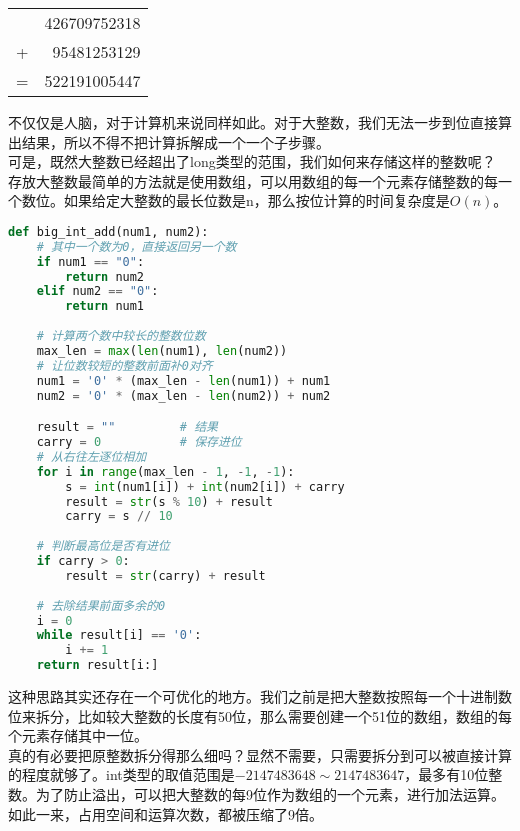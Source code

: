 \begin{table}[H]
	\centering
	\begin{tabular}{cD{.}{.}{3}}
		  & 426709752318 \\
		+ & 95481253129  \\
		\hline
		= & 522191005447
	\end{tabular}
\end{table}

不仅仅是人脑，对于计算机来说同样如此。对于大整数，我们无法一步到位直接算出结果，所以不得不把计算拆解成一个一个子步骤。 \\

可是，既然大整数已经超出了long类型的范围，我们如何来存储这样的整数呢？ \\

存放大整数最简单的方法就是使用数组，可以用数组的每一个元素存储整数的每一个数位。如果给定大整数的最长位数是n，那么按位计算的时间复杂度是$ O(n) $。 \\


\begin{lstlisting}[language=Python]
def big_int_add(num1, num2):
    # 其中一个数为0，直接返回另一个数
    if num1 == "0":
        return num2
    elif num2 == "0":
        return num1
    
    # 计算两个数中较长的整数位数
    max_len = max(len(num1), len(num2))
    # 让位数较短的整数前面补0对齐
    num1 = '0' * (max_len - len(num1)) + num1
    num2 = '0' * (max_len - len(num2)) + num2

    result = ""         # 结果
    carry = 0           # 保存进位
    # 从右往左逐位相加
    for i in range(max_len - 1, -1, -1):
        s = int(num1[i]) + int(num2[i]) + carry
        result = str(s % 10) + result
        carry = s // 10
    
    # 判断最高位是否有进位
    if carry > 0:
        result = str(carry) + result
    
    # 去除结果前面多余的0
    i = 0
    while result[i] == '0':
        i += 1
    return result[i:]
\end{lstlisting}

这种思路其实还存在一个可优化的地方。我们之前是把大整数按照每一个十进制数位来拆分，比如较大整数的长度有50位，那么需要创建一个51位的数组，数组的每个元素存储其中一位。 \\

真的有必要把原整数拆分得那么细吗？显然不需要，只需要拆分到可以被直接计算的程度就够了。int类型的取值范围是$ -2147483648 \sim 2147483647 $，最多有10位整数。为了防止溢出，可以把大整数的每9位作为数组的一个元素，进行加法运算。如此一来，占用空间和运算次数，都被压缩了9倍。

